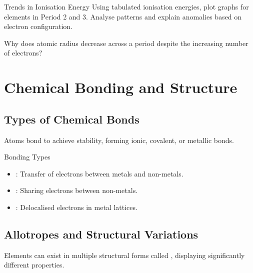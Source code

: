 \begin{investigation}{Trends in Ionisation Energy}
Using tabulated ionisation energies, plot graphs for elements in Period 2 and 3. Analyse patterns and explain anomalies based on electron configuration.
\end{investigation}

\begin{stopandthink}
Why does atomic radius decrease across a period despite the increasing number of electrons?
\end{stopandthink}

\FloatBarrier

\section{Chemical Bonding and Structure}
\FloatBarrier
\FloatBarrier
\FloatBarrier

\subsection{Types of Chemical Bonds}
\FloatBarrier
\FloatBarrier
\FloatBarrier

Atoms bond to achieve stability, forming ionic, covalent, or metallic bonds.

\begin{keyconcept}{Bonding Types}
\begin{itemize}
    \item {}: Transfer of electrons between metals and non-metals.
    \item {}: Sharing electrons between non-metals.
    \item {}: Delocalised electrons in metal lattices.
\end{itemize}
\end{keyconcept}

\subsection{Allotropes and Structural Variations}
\FloatBarrier
\FloatBarrier
\FloatBarrier

Elements can exist in multiple structural forms called , displaying significantly different properties.


